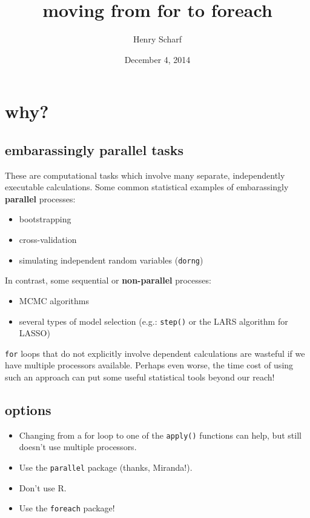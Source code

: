 \documentclass[]{article}
\title{moving from for to foreach}
\author{Henry Scharf}
\date{December 4, 2014}
\begin{document}
\maketitle


{
\hypersetup{linkcolor=black}
\setcounter{tocdepth}{2}
\tableofcontents
}
\section{why?}\label{why}

\subsection{embarassingly parallel
tasks}\label{embarassingly-parallel-tasks}

These are computational tasks which involve many separate, independently
executable calculations. Some common statistical examples of
embarassingly {\textbf{parallel}} processes:

\begin{itemize}
\itemsep1pt\parskip0pt
\item
  bootstrapping
\item
  cross-validation
\item
  simulating independent random variables (\texttt{dorng})
\end{itemize}

In contrast, some sequential or {\textbf{non-parallel}} processes:

\begin{itemize}
\itemsep1pt\parskip0pt
\item
  MCMC algorithms
\item
  several types of model selection (e.g.: \texttt{step()} or the LARS
  algorithm for LASSO)
\end{itemize}

\texttt{for} loops that do not explicitly involve dependent calculations
are wasteful if we have multiple processors available. Perhaps even
worse, the time cost of using such an approach can put some useful
statistical tools beyond our reach!

\subsection{options}\label{options}

\begin{itemize}
\itemsep1pt\parskip0pt
\item
  Changing from a for loop to one of the \texttt{apply()} functions can
  help, but still doesn't use multiple processors.
\item
  Use the \texttt{parallel} package (thanks, Miranda!).
\item
  Don't use R.
\item
  Use the \texttt{foreach} package!
\end{itemize}
\end{document}
